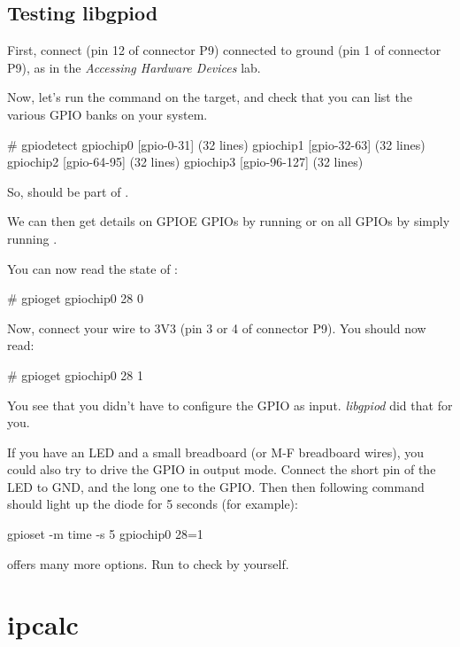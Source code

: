 \subsection{Testing libgpiod}

First, connect  (pin 12 of connector P9) connected
to ground (pin 1 of connector P9), as in the
{\em Accessing Hardware Devices} lab.

Now, let's run the  command on the target, and check that
you can list the various GPIO banks on your system.

\begin{bashinput}
# gpiodetect
gpiochip0 [gpio-0-31] (32 lines)
gpiochip1 [gpio-32-63] (32 lines)
gpiochip2 [gpio-64-95] (32 lines)
gpiochip3 [gpio-96-127] (32 lines)
\end{bashinput}

So,  should be part of .

We can then get details on GPIOE GPIOs by running  or on all GPIOs by simply running .

You can now read the state of :

\begin{bashinput}
# gpioget gpiochip0 28
0
\end{bashinput}

Now, connect your wire to 3V3 (pin 3 or 4 of connector P9). You should now
read:

\begin{bashinput}
# gpioget gpiochip0 28
1
\end{bashinput}

You see that you didn't have to configure the GPIO as input. {\em
libgpiod} did that for you.

If you have an LED and a small breadboard (or M-F breadboard wires),
you could also try to drive the GPIO in output mode. Connect the short
pin of the LED to GND, and the long one to the GPIO. Then then following
command should light up the diode for 5 seconds (for example):

\begin{bashinput}
gpioset -m time -s 5  gpiochip0 28=1
\end{bashinput}

 offers many more options. Run  to
check by yourself.

\section{ipcalc}

